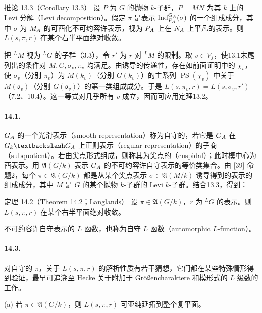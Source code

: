 \begin{originaltheorem}{推论 13.3（Corollary 13.3）}
设 $P$ 为 $G$ 的抛物 $k$-子群，$P=MN$ 为其 $k$ 上的 Levi 分解（Levi decomposition）。假定 $\pi$ 是表示 $\operatorname{Ind}_{P_{A}}^{G_{A}}(\sigma)$ 的一个组成成分，其中 $\sigma$ 为 $M_{A}$ 的可酉化不可约容许表示，视为 $P_{A}$ 上在 $N_{A}$ 上平凡的表示。则 $L(s,\pi,r)$ 在某个右半平面绝对收敛。
\end{originaltheorem}
把 ${}^LM$ 视为 ${}^LG$ 的子群（3.3），令 $r'$ 为 $r$ 对 ${}^LM$ 的限制。取 $v\in V_f$，使13.1末尾列出的条件对 $M,G,\sigma_v,\pi_v$ 均满足。由诱导的传递性，存在如前面证明中的 $\chi_v$，使 $\sigma_v$（分别 $\pi_v$）为 $M(k_v)$（分别 $G(k_v)$）的主系列 $\operatorname{PS}(\chi_v)$ 中关于 $M(\mathfrak o_v)$（分别 $G(\mathfrak o_v)$）的第一类组成成分。于是 $L(s,\pi_v,r)=L(s,\sigma_v,r')$（7.2、10.4）。这一等式对几乎所有 $v$ 成立，因而可应用定理13.2。

\paragraph*{14.1.} $G_{A}$ 的一个光滑表示（smooth representation）称为自守的，若它是 $G_{A}$ 在 $G_k\backslash G_{\A}$ 上正则表示（regular representation）的子商（subquotient）。若由尖点形式组成，则称其为尖点的（cuspidal）；此时模中心为酉表示。用 $\mathfrak A(G/k)$ 表示 $G_{A}$ 的不可约容许自守表示的等价类集合。由 [39] 命题2，每个 $\pi\in\mathfrak A(G/k)$ 都是从某个尖点表示 $\sigma\in\mathfrak A(M/k)$ 诱导得到的表示的组成成分，其中 $M$ 是 $G$ 的某个抛物 $k$-子群的 Levi $k$-子群。结合13.3，得到：

\begin{originaltheorem}{定理 14.2（Theorem 14.2；Langlands）}
设 $\pi\in\mathfrak A(G/k)$，$r$ 为 ${}^LG$ 的表示。则 $L(s,\pi,r)$ 在某个右半平面绝对收敛。
\end{originaltheorem}
不可约容许自守表示的 $L$ 函数，也称为自守 $L$ 函数（automorphic $L$-function）。

\paragraph*{14.3.} 对自守的 $\pi$，关于 $L(s,\pi,r)$ 的解析性质有若干猜想，它们都在某些特殊情形得到验证，最早可追溯至 Hecke 关于附加于 Größencharaktere 和模形式的 $L$ 级数的工作。

(a) 若 $\pi\in\mathfrak A(G/k)$，则 $L(s,\pi,r)$ 可亚纯延拓到整个复平面。

